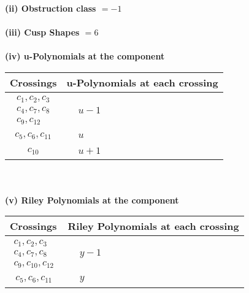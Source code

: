 \documentclass[1p]{elsarticle_modified}
\theoremstyle{definition}
\begin{document}
\flushleft \textbf{(ii) Obstruction class $= -1$}\\~\\
\flushleft \textbf{(iii) Cusp Shapes $= 6$}\\~\\
\newpage\renewcommand{\arraystretch}{1}
\flushleft \textbf{(iv) u-Polynomials at the component}\newline \\
\begin{tabular}{m{50pt}|m{274pt}}
Crossings & \hspace{64pt}u-Polynomials at each crossing \\
\hline $$\begin{aligned}c_{1},c_{2},c_{3}\\c_{4},c_{7},c_{8}\\c_{9},c_{12}\end{aligned}$$&$\begin{aligned}
&u-1
\end{aligned}$\\
\hline $$\begin{aligned}c_{5},c_{6},c_{11}\end{aligned}$$&$\begin{aligned}
&u
\end{aligned}$\\
\hline $$\begin{aligned}c_{10}\end{aligned}$$&$\begin{aligned}
&u+1
\end{aligned}$\\
\hline
\end{tabular}\\~\\
\newpage\renewcommand{\arraystretch}{1}
\flushleft \textbf{(v) Riley Polynomials at the component}\newline \\
\begin{tabular}{m{50pt}|m{274pt}}
Crossings & \hspace{64pt}Riley Polynomials at each crossing \\
\hline $$\begin{aligned}c_{1},c_{2},c_{3}\\c_{4},c_{7},c_{8}\\c_{9},c_{10},c_{12}\end{aligned}$$&$\begin{aligned}
&y-1
\end{aligned}$\\
\hline $$\begin{aligned}c_{5},c_{6},c_{11}\end{aligned}$$&$\begin{aligned}
&y
\end{aligned}$\\
\hline
\end{tabular}\\~\\
\end{document}
